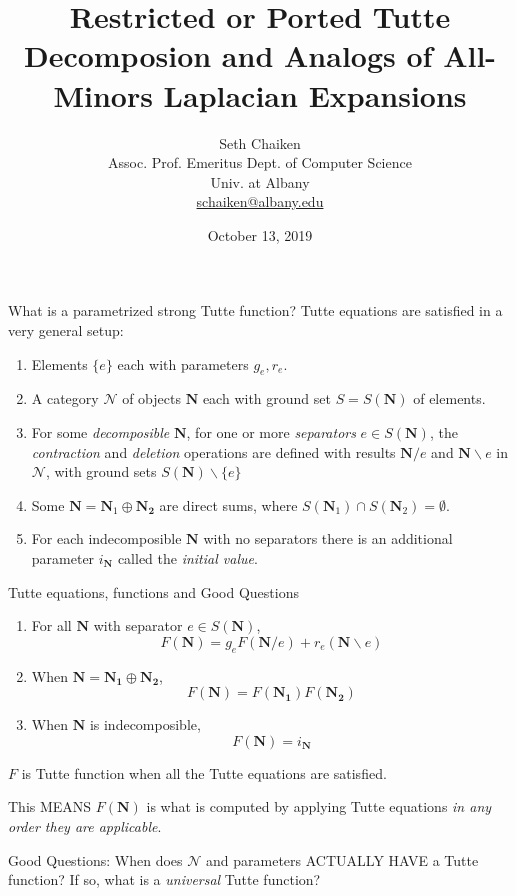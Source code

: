 \documentclass{beamer}
\title{Restricted or Ported Tutte Decomposion and Analogs
  of All-Minors Laplacian Expansions}
\author{Seth Chaiken\\
  Assoc. Prof. Emeritus Dept. of Computer Science\\
Univ. at Albany\\
\url{schaiken@albany.edu}
}
\date{October 13, 2019}
\newcommand{\ext}[1]{\ensuremath{\mathbf{#1}}}
\begin{document}
\begin{frame}
 \titlepage
\end{frame}

\begin{frame}{What is a parametrized strong Tutte function?}
  Tutte equations are satisfied in a very general setup:
  \begin{enumerate}
  \item Elements $\{e\}$ each with parameters $g_e, r_e$.
  \item A category $\mathcal{N}$
    of objects $\ext{N}$ each with ground set $S=S(\ext{N})$
    of elements.
  \item For some \emph{decomposible}
    $\ext{N}$, for one or more \emph{separators} $e\in S(\ext{N})$, the
    \emph{contraction} and \emph{deletion} operations are defined with
    results $\ext{N}/e$ and $\ext{N}\backslash e$ in $\mathcal{N}$,
    with ground sets
    $S(\ext{N})\backslash\{e\}$
  \item Some $\ext{N}=\ext{N}_1\oplus\ext{N_2}$ are direct sums, where
    $S(\ext{N}_1)\cap S(\ext{N}_2)=\emptyset$.
  \item For each indecomposible $\ext{N}$ with no separators there is
    an additional parameter $i_{\ext{N}}$ called the \emph{initial value}.
  \end{enumerate}
\end{frame}

\begin{frame}{Tutte equations, functions and Good Questions}
  \begin{enumerate}
  \item For all $\ext{N}$ with separator $e\in S(\ext{N})$,
    \[
    F(\ext{N}) = g_eF(\ext{N}/e) + r_e(\ext{N}\backslash e)
    \]
  \item When $\ext{N}=\ext{N_1}\oplus\ext{N_2}$,
    \[
    F(\ext{N}) = F(\ext{N_1})F(\ext{N_2})
    \]
  \item When $\ext{N}$ is indecomposible,
    \[
    F(\ext{N}) = i_{\ext{N}}
    \]
  \end{enumerate}
  $F$ is Tutte function when all the Tutte equations are satisfied.

  This MEANS $F(\ext{N})$ is what is computed by applying Tutte
  equations \emph{in any order they are applicable}.
  
  Good Questions: When does $\mathcal{N}$ and parameters ACTUALLY
  HAVE a Tutte function?  If so, what is a \emph{universal} Tutte function?

\end{frame}
\end{document}
